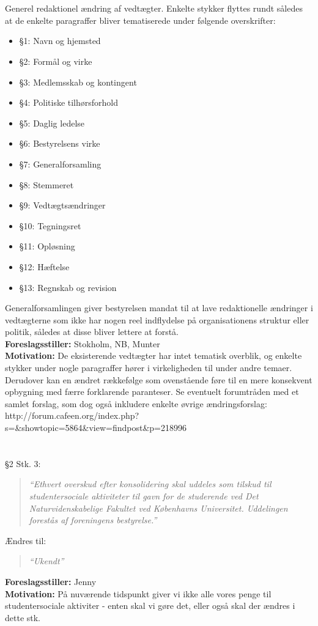 \documentclass[a4paper,12pt,danish]{article}
\newcommand\cit[1]{
    \begin{quote}
        \textit{``#1''}
    \end{quote}
}
\newcommand\who[1]{
    \textbf{Foreslagsstiller:} #1\\
}
\newcommand\why[1]{
    \textbf{Motivation:} #1\\
}
\newcommand\change[1]{
    \section{}
    #1
}
\begin{document}
\change{
	Generel redaktionel ændring af vedtægter. Enkelte stykker flyttes rundt således at de enkelte paragraffer bliver tematiserede under følgende overskrifter:
    \begin{itemize}
        \item \S1: Navn og hjemsted
        \item \S2: Formål og virke
        \item \S3: Medlemsskab og kontingent
        \item \S4: Politiske tilhørsforhold
        \item \S5: Daglig ledelse
        \item \S6: Bestyrelsens virke
        \item \S7: Generalforsamling
        \item \S8: Stemmeret
        \item \S9: Vedtægtsændringer
        \item \S10: Tegningsret
        \item \S11: Opløsning
        \item \S12: Hæftelse
        \item \S13: Regnskab og revision
    \end{itemize}
    Generalforsamlingen giver bestyrelsen mandat til at lave redaktionelle ændringer i vedtægterne som ikke har nogen reel indflydelse på organisationens struktur eller politik, således at disse bliver lettere at forstå.\\

    \who{Stokholm, NB, Munter}
    \why{De eksisterende vedtægter har intet tematisk overblik, og enkelte stykker under nogle paragraffer hører i virkeligheden til under andre temaer. Derudover kan en ændret rækkefølge som ovenstående føre til en mere konsekvent opbygning med færre forklarende paranteser. Se eventuelt forumtråden med et samlet forslag, som dog også inkludere enkelte øvrige ændringsforslag:\\
    http://forum.cafeen.org/index.php?s=\&showtopic=5864\&view=findpost\&p=218996}
}


\change{
	\S2 Stk. 3:
    \cit{Ethvert overskud efter konsolidering skal uddeles som tilskud til studentersociale aktiviteter til gavn for de studerende ved Det Naturvidenskabelige Fakultet ved Københavns Universitet. Uddelingen forestås af foreningens bestyrelse.}
    Ændres til:
    \cit{Ukendt}
    \who{Jenny}
    \why{På nuværende tidspunkt giver vi ikke alle vores penge til studentersociale aktiviter - enten skal vi gøre det, eller også skal der ændres i dette stk.}
}
\end{document}
